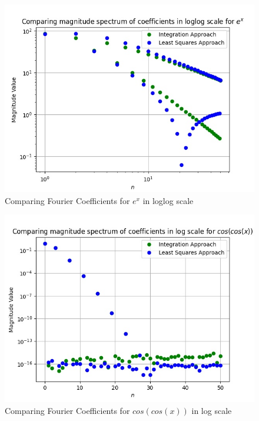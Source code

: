 \documentclass{article}
\begin{document}
\begin{figure}[!tbh]
    \centering
    \includegraphics[scale=0.65]{plots/Comparing magnitude spectrum of coefficients in loglog scale for $e^x$.jpg}
    \caption{Comparing Fourier Coefficients for $e^x$ in loglog scale}
    \label{fig:Figure 8}
    \end{figure}

\begin{figure}[!tbh]
    \centering
    \includegraphics[scale=0.65]{plots/Comparing magnitude spectrum of coefficients in log scale for $cos(cos(x))$.jpg}
    \caption{Comparing Fourier Coefficients for $cos(cos(x))$ in log scale}
    \label{fig:Figure 9}
    \end{figure}
\end{document}

